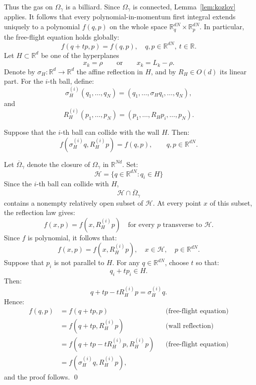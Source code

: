 \documentclass[12pt,reqno]{amsart}
\makeatletter
\renewenvironment{proof}[1][\proofname]{%
  \par\vspace{\topsep}%
  \normalfont\topsep6\p@\@plus6\p@\relax
  \trivlist
  \item[\hskip\labelsep\itshape #1\@addpunct{.}]\ignorespaces
}{%
  \endtrivlist
}
\numberwithin{equation}{section}
\def \R {\mathbb{R}}
\makeatother
\begin{document}
Thus the gas on \(\Omega_\gamma\) is 
a billiard. Since
\(\Omega_\gamma\) is connected, Lemma~\ref{lem:kozlov} applies. 
It follows that every polynomial-in-momentum first integral extends uniquely to a polynomial \(f(q,p)\) on the whole space \(\R^{dN}_q\times\R^{dN}_p\). In particular, the free-flight
equation holds globally:
\[
f(q+tp,p)=f(q,p),
\quad q,p\in\R^{dN},\ t\in\R.
\]
Let \(H\subset\R^d\) be one of the 
hyperplanes
\[
x_k=\rho
\qquad\text{or}\qquad
x_k=L_k-\rho.
\]
Denote by \(\sigma_H:\R^d\to\R^d\) the affine reflection in \(H\), and
by \(R_H\in O(d)\) its linear part. For the \(i\)-th ball, define:
\[
\sigma_H^{(i)}(q_1,\ldots,q_N)
=
(q_1,\ldots,\sigma_H q_i,\ldots,q_N),
\]
and
\[
R_H^{(i)}(p_1,\ldots,p_N)
=
(p_1,\ldots, R_H p_i,\ldots,p_N).
\]
\begin{lemma}\label{lem:ball-wall}
Suppose that the \(i\)-th ball can collide with the wall \(H\). Then:
\[
f(\sigma_H^{(i)}q,R_H^{(i)}p)=f(q,p),
\qquad q,p\in\R^{dN}.
\]
\end{lemma}
\begin{proof}
Let \(\overline{\Omega}_\gamma\) denote 
the closure of \(\Omega_\gamma\) in \(\R^{N d}\). Set:
\[
\mathcal H
=
\{q\in\R^{dN}:q_i\in H\}
\]
Since the \(i\)-th 
ball can collide with \(H\), 
\[
\mathcal H \cap \overline{\Omega}_\gamma
\]
contains a nonempty relatively open subset of \(\mathcal H\). At every point \(x\) of this subset, the reflection law gives:
\[
f(x,p)=f(x,R_H^{(i)}p)\quad 
\text{for every \(p\) 
transverse to \(\mathcal H\).}
\]
Since \(f\) is polynomial, it 
follows that:
\[
f(x,p)=f(x,R_H^{(i)}p),
\quad
x\in\mathcal H,\quad p\in\R^{dN}.
\]
Suppose that \(p_i\) is not parallel to \(H\). For any \(q\in\R^{dN}\),
choose \(t\) so that:
\[
q_i+tp_i\in H.
\]
Then:
\[
q+tp-tR_H^{(i)}p=\sigma_H^{(i)}q.
\]
Hence:
\[
\begin{aligned}
f(q,p)
&=f(q+tp,p)
&&\text{(free-flight equation)}\\
&=f(q+tp,R_H^{(i)}p)
&&\text{(wall reflection)}\\
&=f(q+tp-tR_H^{(i)}p,R_H^{(i)}p)
&&\text{(free-flight equation)}\\
&=f(\sigma_H^{(i)}q,R_H^{(i)}p),
\end{aligned}
\]
and the proof follows. \qed
\end{proof}
\end{document}

